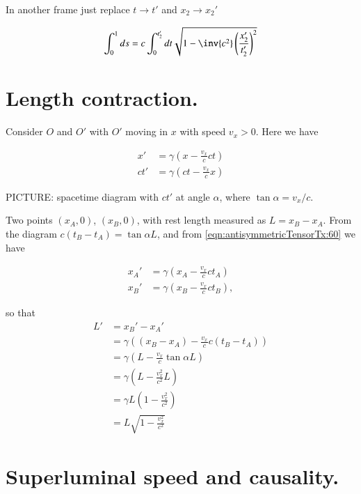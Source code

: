In another frame just replace $t \rightarrow t'$ and $x_2 \rightarrow x_2'$

\begin{equation}\label{eqn:relativisticElectrodynamicsL5:50}
\int_0^1 ds 
= c \int_0^{t_2'} dt \sqrt{1 - \inv{c^2} \left(\frac{x_2'}{t_2'}\right)^2 } \\
\end{equation}

\section{Length contraction.}

Consider $O$ and $O'$ with $O'$ moving in $x$ with speed $v_x > 0$.  Here we have

\begin{align}\label{eqn:antisymmetricTensorTx:60}
x' &= \gamma \left( x - \frac{v_x}{c} ct \right) \\
c t' &= \gamma \left( ct - \frac{v_x}{c} x \right) 
\end{align}

PICTURE: spacetime diagram with $ct'$ at angle $\alpha$, where $\tan \alpha = v_x/c$.

Two points $(x_A,0)$, $(x_B,0)$, with rest length measured as $L = x_B - x_A$.  From the diagram $c(t_B - t_A) = \tan\alpha L$, and from \ref{eqn:antisymmetricTensorTx:60} we have

\begin{align}\label{eqn:antisymmetricTensorTx:70}
x_A' &= \gamma \left( x_A - \frac{v_x}{c} c t_A \right) \\
x_B' &= \gamma \left( x_B - \frac{v_x}{c} c t_B \right),
\end{align}

so that 
\begin{align*}
L' &= x_B' - x_A' \\
&= \gamma \left( (x_B - x_A) - \frac{v_x}{c} c (t_B -t_A) \right) \\
&= \gamma \left( L - \frac{v_x}{c} \tan \alpha L \right) \\
&= \gamma \left( L - \frac{v_x^2}{c^2} L \right) \\
&= \gamma L \left( 1 - \frac{v_x^2}{c^2} \right) \\
&= L \sqrt{ 1 - \frac{v_x^2}{c^2} } 
\end{align*}

\section{Superluminal speed and causality.}

